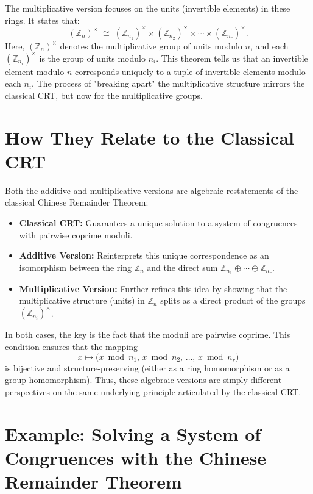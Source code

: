 \documentclass[12pt]{article}
\theoremstyle{definition} %
\theoremstyle{plain} %
\begin{document}
The multiplicative version focuses on the units (invertible elements) in these rings. It states that:
\[
(\mathbb{Z}_n)^\times \;\cong\; (\mathbb{Z}_{n_1})^\times \times (\mathbb{Z}_{n_2})^\times \times \cdots \times (\mathbb{Z}_{n_r})^\times.
\]
Here, \((\mathbb{Z}_n)^\times\) denotes the multiplicative group of units modulo \(n\), and each \((\mathbb{Z}_{n_i})^\times\) is the group of units modulo \(n_i\). This theorem tells us that an invertible element modulo \(n\) corresponds uniquely to a tuple of invertible elements modulo each \(n_i\). The process of "breaking apart" the multiplicative structure mirrors the classical CRT, but now for the multiplicative groups.

\section*{How They Relate to the Classical CRT}

Both the additive and multiplicative versions are algebraic restatements of the classical Chinese Remainder Theorem:

\begin{itemize}
    \item \textbf{Classical CRT:} Guarantees a unique solution to a system of congruences with pairwise coprime moduli.
    \item \textbf{Additive Version:} Reinterprets this unique correspondence as an isomorphism between the ring \(\mathbb{Z}_n\) and the direct sum \(\mathbb{Z}_{n_1} \oplus \cdots \oplus \mathbb{Z}_{n_r}\).
    \item \textbf{Multiplicative Version:} Further refines this idea by showing that the multiplicative structure (units) in \(\mathbb{Z}_n\) splits as a direct product of the groups \((\mathbb{Z}_{n_i})^\times\).
\end{itemize}

In both cases, the key is the fact that the moduli are pairwise coprime. This condition ensures that the mapping
\[
x \mapsto \bigl(x \bmod n_1,\, x \bmod n_2,\, \dots,\, x \bmod n_r\bigr)
\]
is bijective and structure-preserving (either as a ring homomorphism or as a group homomorphism). Thus, these algebraic versions are simply different perspectives on the same underlying principle articulated by the classical CRT.

\section*{Example: Solving a System of Congruences with the Chinese Remainder Theorem}
\end{document}
